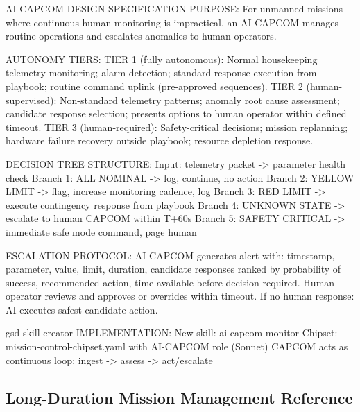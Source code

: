 \documentclass[11pt,letterpaper]{article}
\begin{document}
\begin{capcombox}{AI CAPCOM DESIGN SPECIFICATION}
PURPOSE: For unmanned missions where continuous human monitoring is
         impractical, an AI CAPCOM manages routine operations and
         escalates anomalies to human operators.

AUTONOMY TIERS:
  TIER 1 (fully autonomous): Normal housekeeping telemetry monitoring;
    alarm detection; standard response execution from playbook;
    routine command uplink (pre-approved sequences).
  TIER 2 (human-supervised): Non-standard telemetry patterns;
    anomaly root cause assessment; candidate response selection;
    presents options to human operator within defined timeout.
  TIER 3 (human-required): Safety-critical decisions; mission replanning;
    hardware failure recovery outside playbook; resource depletion response.

DECISION TREE STRUCTURE:
  Input: telemetry packet -> parameter health check
  Branch 1: ALL NOMINAL -> log, continue, no action
  Branch 2: YELLOW LIMIT -> flag, increase monitoring cadence, log
  Branch 3: RED LIMIT -> execute contingency response from playbook
  Branch 4: UNKNOWN STATE -> escalate to human CAPCOM within T+60s
  Branch 5: SAFETY CRITICAL -> immediate safe mode command, page human

ESCALATION PROTOCOL:
  AI CAPCOM generates alert with: timestamp, parameter, value, limit,
  duration, candidate responses ranked by probability of success,
  recommended action, time available before decision required.
  Human operator reviews and approves or overrides within timeout.
  If no human response: AI executes safest candidate action.

gsd-skill-creator IMPLEMENTATION:
  New skill: ai-capcom-monitor
  Chipset: mission-control-chipset.yaml with AI-CAPCOM role (Sonnet)
  CAPCOM acts as continuous loop: ingest -> assess -> act/escalate
\end{capcombox}

\subsection{Long-Duration Mission Management Reference}
\end{document}

